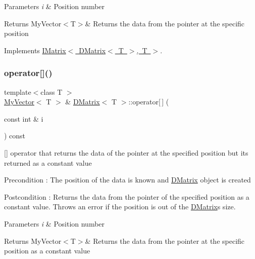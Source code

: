 \begin{DoxyParams}{Parameters}
{\em i} & Position number \\
\hline
\end{DoxyParams}
\begin{DoxyReturn}{Returns}
My\+Vector$<$\+T$>$\& Returns the data from the pointer at the specific position 
\end{DoxyReturn}


Implements \mbox{\hyperlink{class_i_matrix_a3cfb2490e2849c6c19c1979066a64818}{I\+Matrix$<$ D\+Matrix$<$ T $>$, T $>$}}.

\mbox{\label{class_d_matrix_a2c5cfd854a492586198c69219f31a81d}} 
\subsubsection{\texorpdfstring{operator[]()}{operator[]()}\hspace{0.1cm}{\footnotesize\ttfamily [2/2]}}
{\footnotesize\ttfamily template$<$class T $>$ \\
\mbox{\hyperlink{class_my_vector}{My\+Vector}}$<$ T $>$ \& \mbox{\hyperlink{class_d_matrix}{D\+Matrix}}$<$ T $>$\+::operator\mbox{[}$\,$\mbox{]} (\begin{DoxyParamCaption}\item[{const int \&}]{i }\end{DoxyParamCaption}) const\hspace{0.3cm}{\ttfamily [virtual]}}



\mbox{[}\mbox{]} operator that returns the data of the pointer at the specified position but its returned as a constant value 

\begin{DoxyPrecond}{Precondition}
\+: The position of the data is known and \mbox{\hyperlink{class_d_matrix}{D\+Matrix}} object is created 
\end{DoxyPrecond}
\begin{DoxyPostcond}{Postcondition}
\+: Returns the data from the pointer of the specified position as a constant value. Throws an error if the position is out of the \mbox{\hyperlink{class_d_matrix}{D\+Matrix}}\textquotesingle{}s size. 
\end{DoxyPostcond}

\begin{DoxyParams}{Parameters}
{\em i} & Position number \\
\hline
\end{DoxyParams}
\begin{DoxyReturn}{Returns}
My\+Vector$<$\+T$>$\& Returns the data from the pointer at the specific position as a constant value 
\end{DoxyReturn}


